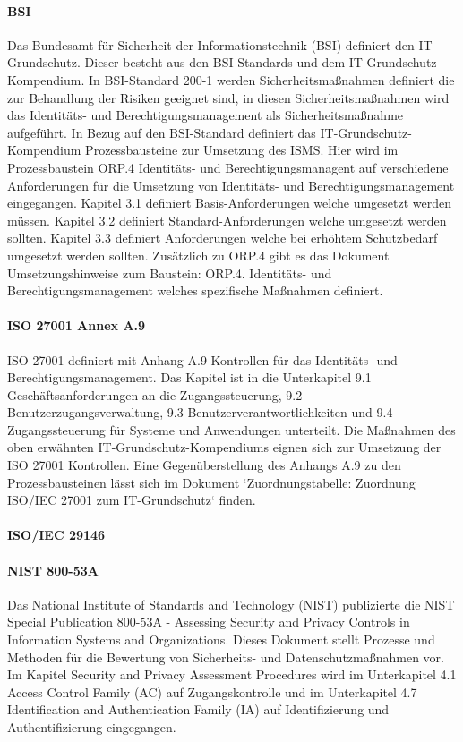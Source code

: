 \documentclass[10pt]{article}
\begin{document}
\paragraph{BSI}
Das Bundesamt für Sicherheit der Informationstechnik (BSI) definiert den IT-Grundschutz. Dieser besteht aus den BSI-Standards und dem IT-Grundschutz-Kompendium. In BSI-Standard 200-1 werden Sicherheitsmaßnahmen definiert die zur Behandlung der Risiken geeignet sind, in diesen Sicherheitsmaßnahmen wird das Identitäts- und Berechtigungsmanagement als Sicherheitsmaßnahme aufgeführt. In Bezug auf den BSI-Standard definiert das IT-Grundschutz-Kompendium Prozessbausteine zur Umsetzung des ISMS. Hier wird im Prozessbaustein \glqq{}ORP.4 Identitäts- und Berechtigungsmanagent\grqq{} auf verschiedene Anforderungen für die Umsetzung von Identitäts- und Berechtigungsmanagement eingegangen. Kapitel 3.1 definiert Basis-Anforderungen welche umgesetzt werden müssen. Kapitel 3.2 definiert Standard-Anforderungen welche umgesetzt werden sollten. Kapitel 3.3 definiert Anforderungen welche bei erhöhtem Schutzbedarf umgesetzt werden sollten. Zusätzlich zu ORP.4 gibt es das Dokument \glqq{}Umsetzungshinweise zum Baustein: ORP.4. Identitäts- und Berechtigungsmanagement\grqq{} welches spezifische Maßnahmen definiert.~\cite{orp4}
\paragraph{ISO 27001 Annex A.9}
ISO 27001 definiert mit Anhang A.9 Kontrollen für das Identitäts- und Berechtigungsmanagement. Das Kapitel ist in die Unterkapitel \glqq{}9.1 Geschäftsanforderungen an die Zugangssteuerung\grqq{}, \glqq{}9.2 Benutzerzugangsverwaltung\grqq{}, \glqq{}9.3 Benutzerverantwortlichkeiten\grqq{} und \glqq{}9.4 Zugangssteuerung für Systeme und Anwendungen\grqq{} unterteilt. Die Maßnahmen des oben erwähnten IT-Grundschutz-Kompendiums eignen sich zur Umsetzung der ISO 27001 Kontrollen. Eine Gegenüberstellung des Anhangs A.9 zu den Prozessbausteinen lässt sich im Dokument `Zuordnungstabelle: Zuordnung ISO/IEC 27001 zum IT-Grundschutz` finden.
\paragraph{ISO/IEC 29146}
\paragraph{NIST 800-53A}
Das National Institute of Standards and Technology (NIST) publizierte die \glqq{}NIST Special Publication 800-53A - Assessing Security and Privacy Controls in Information Systems and Organizations\grqq{}. Dieses Dokument stellt Prozesse und Methoden für die Bewertung von Sicherheits- und Datenschutzmaßnahmen vor. Im Kapitel \glqq{}Security and Privacy Assessment Procedures\grqq{} wird im Unterkapitel 4.1 \glqq{}Access Control Family (AC)\grqq{} auf Zugangskontrolle und im Unterkapitel 4.7 \glqq{}Identification and Authentication Family (IA)\grqq{} auf Identifizierung und Authentifizierung eingegangen.
\end{document}
